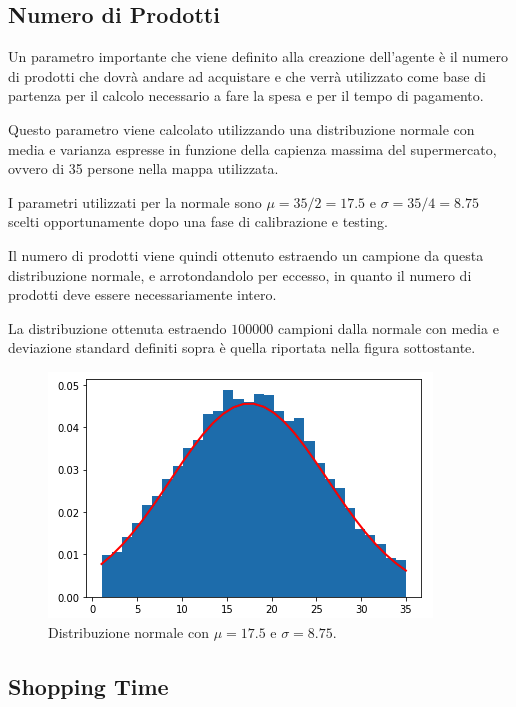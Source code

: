 \subsection{Numero di Prodotti}

Un parametro importante che viene definito alla creazione dell'agente è il numero di prodotti che dovrà andare ad acquistare e che verrà utilizzato come base di partenza per il calcolo necessario a fare la spesa e per il tempo di pagamento. 

Questo parametro viene calcolato utilizzando una distribuzione normale con media e varianza espresse in funzione della capienza massima del supermercato, ovvero di 35 persone nella mappa utilizzata.

I parametri utilizzati per la normale sono $\mu = 35/2 = 17.5$ e $\sigma = 35/4 = 8.75$ scelti opportunamente dopo una fase di calibrazione e testing. 

Il numero di prodotti viene quindi ottenuto estraendo un campione da questa distribuzione normale, e arrotondandolo per eccesso, in quanto il numero di prodotti deve essere necessariamente intero.

La distribuzione ottenuta estraendo $100000$ campioni dalla normale con media e deviazione standard definiti sopra è quella riportata nella figura sottostante. 

\begin{figure}[h!]
    \includegraphics[width=\linewidth]{img/pcount-distribution.png}
    \centering
    \caption{Distribuzione normale con $\mu=17.5$ e $\sigma=8.75$.}
\end{figure}

\subsection{Shopping Time}

